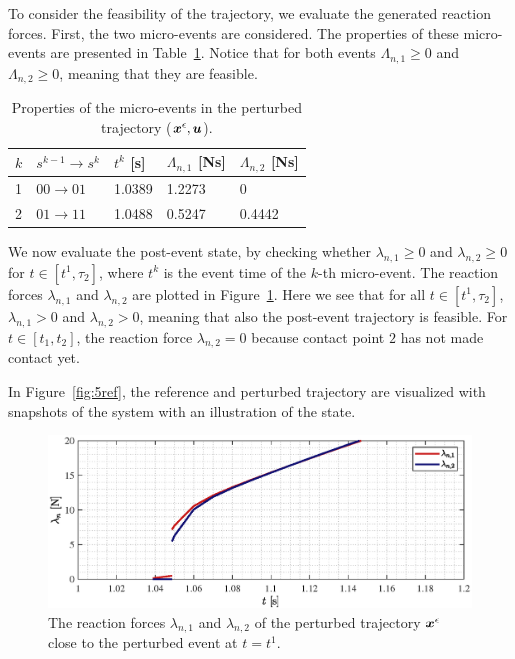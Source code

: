 \documentclass[../DC2019003Bouma.tex]{subfiles}
\begin{document}
To consider the feasibility of the trajectory, we evaluate the generated reaction forces. First, the two micro-events are considered. The properties of these micro-events are presented in Table~\ref{tab:pertevent}. Notice that for both events $\Lambda_{n,1}\geq 0$ and $\Lambda_{n,2}\geq 0$, meaning that they are feasible.
\begin{table}[h!]
\centering
\caption{Properties of the micro-events in the perturbed trajectory (${\boldsymbol{x}}^\epsilon,{\boldsymbol{u}}$).}\label{tab:pertevent}
\begin{tabular}{l|l|l|l|l}
$k$ & $s^{k-1}\rightarrow s^k$ & $t^k$ {[}s{]} & $\Lambda_{n,1}$ {[}Ns{]} & $\Lambda_{n,2}$ {[}Ns{]} \\ \hline
1   & $00\rightarrow 01$       & 1.0389        & 1.2273                   & 0                        \\
2   & $01\rightarrow 11$       & 1.0488        & 0.5247                   & 0.4442                  
\end{tabular}
\end{table}

We now evaluate the post-event state, by checking whether $\lambda_{n,1}\geq 0$ and $\lambda_{n,2}\geq 0$ for $t\in [t^1,\tau_2]$, where $t^k$ is the event time of the $k$-th micro-event. The reaction forces $\lambda_{n,1}$ and $\lambda_{n,2}$ are plotted in Figure~\ref{fig:5lambda}. Here we see that for all $t\in [t^1,\tau_2]$, $\lambda_{n,1}> 0$ and $\lambda_{n,2}> 0$, meaning that also the post-event trajectory is feasible. For $t\in[t_1,t_2]$, the reaction force $\lambda_{n,2}= 0$ because contact point $2$ has not made contact yet.

In Figure~\ref{fig:5ref}, the reference and perturbed trajectory are visualized with snapshots of the system with an illustration of the state.


\begin{figure}[bt!]
\centering
\includegraphics[width=\textwidth]{lambda.eps}\caption{The reaction forces $\lambda_{n,1}$ and $\lambda_{n,2}$ of the perturbed trajectory ${\boldsymbol{x}}^\epsilon$ close to the perturbed event at $t=t^1$.}\label{fig:5lambda}
\end{figure}
\end{document}
